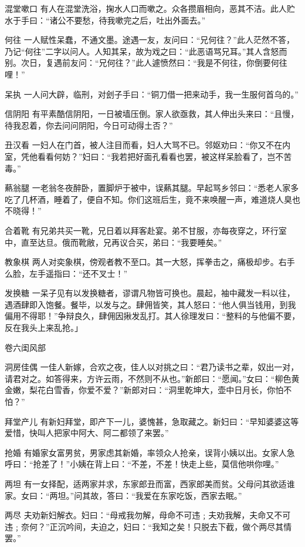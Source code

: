 \documentclass[12pt,UTF8]{ctexbook}
\begin{document}
混堂嗽口
有人在混堂洗浴，掬水人口而嗽之。众各攒眉相向，恶其不洁。此人贮水于手曰：“诸公不要愁，待我嗽完之后，吐出外面去。”

何往
一人赋性呆蠢，不通文墨。途遇一友，友问曰：“兄何往？”此人茫然不答，乃记“何往”二字以问人。人知其呆，故为戏之曰：“此恶语骂兄耳。”其人含怒而别。次日，复遇前友问：“兄何往？”此人遽愤然曰：“我是不何往，你倒要何往哩！”

呆执
一人问大辟，临刑，对刽子手曰：“铜刀借一把来动手，我一生服何首乌的。”

信阴阳
有平素酷信阴阳，一日被墙压倒。家人欲亟救，其人伸出头来曰：“且慢，待我忍着，你去问问阴阳，今日可动得土否？”

丑汉看
一妇人在门首，被人注目而看，妇人大骂不已。邻妪劝曰：“你又不在内室，凭他看看何妨？”妇曰：“我若把好面孔看看也罢，被这样呆脸看了，岂不苦毒。”

爇翁腿
一老翁冬夜醉卧，置脚炉于被中，误爇其腿。早起骂乡邻曰：“悉老人家多吃了几杯酒，睡着了，便自不知。你们这班后生，竟不来唤醒一声，难道烧人臭也不晓得！”

合着靴
有兄弟共买一靴，兄日着以拜客赴宴。弟不甘服，亦每夜穿之，环行室中，直至达旦。俄而靴敝，兄再议合买，弟曰：“我要睡矣。”

教象棋
两人对奕象棋，傍观者教不至口。其一大怒，挥拳击之，痛极却步。右手么脸，左手遥指曰：“还不叉士！”

发换糖
一呆子见有以发换糖者，谬谓凡物皆可换也。晨起，袖中藏发一料以往，遇酒肆即入饱餐。餐毕，以发与之。肆佣皆笑，其人怒曰：“他人俱当钱用，到我偏用不得耶！”争辩良久，肆佣因揪发乱打。其人徐理发曰：“整料的与他偏不要，反在我头上来乱抢。」

卷六闺风部

洞房佳偶
一佳人新嫁，合欢之夜，佳人以对挑之曰：“君乃读书之辈，奴出一对，请君对之。如答得来，方许云雨，不然则不从也。”新郎曰：“愿闻。”女曰：“柳色黄金嫩，梨花白雪香，你爱不爱？”新郎对曰：“洞里乾坤大，壶中日月长，你怕不怕？”

拜堂产儿
有新妇拜堂，即产下一儿，婆愧甚，急取藏之。新妇曰：“早知婆婆这等爱惜，快叫人把家中阿大、阿二都领了来罢。”

抢婚
有婚家女富男贫，男家虑其新婚，率领众人抢亲，误背小姨以出。女家人急呼曰：“抢差了！”小姨在背上曰：“不差，不差！快走上些，莫信他哄你哩。”

两坦
有一女择配，适两家并求，东家郎丑而富，西家郎美而贫。父母问其欲适谁家。女曰：“两坦。”问其故，答曰：“我爱在东家吃饭，西家去眠。”

两尽
夫劝新妇解衣。妇曰：“母戒我勿解，母命不可违﹔夫劝我解，夫命又不可违﹔奈何？”正沉吟间，夫迫之，妇曰：“我知之矣！只脱去下截，做个两尽其情罢。”
\end{document}
